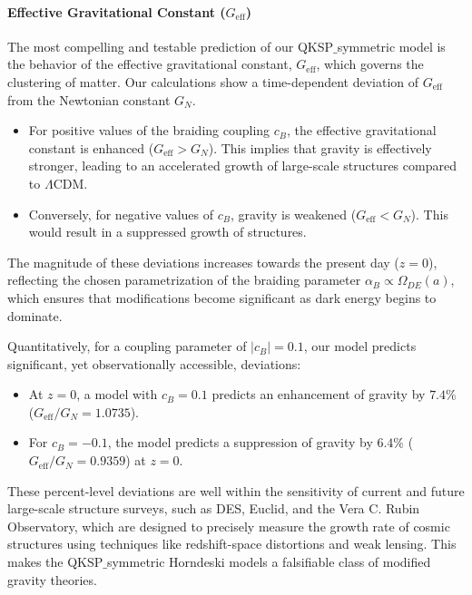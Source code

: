\documentclass[twocolumn]{aastex631}
\begin{document}
\paragraph{Effective Gravitational Constant ($G_{\text{eff}}$)}
The most compelling and testable prediction of our QKSP\ensuremath{\_}symmetric model is the behavior of the effective gravitational constant, $G_{\text{eff}}$, which governs the clustering of matter. Our calculations show a time-dependent deviation of $G_{\text{eff}}$ from the Newtonian constant $G_N$.
\begin{itemize}
    \item For positive values of the braiding coupling $c_B$, the effective gravitational constant is enhanced ($G_{\text{eff}} > G_N$). This implies that gravity is effectively stronger, leading to an accelerated growth of large-scale structures compared to $\Lambda$CDM.
    \item Conversely, for negative values of $c_B$, gravity is weakened ($G_{\text{eff}} < G_N$). This would result in a suppressed growth of structures.
\end{itemize}
The magnitude of these deviations increases towards the present day ($z=0$), reflecting the chosen parametrization of the braiding parameter $\alpha_B \propto \Omega_{DE}(a)$, which ensures that modifications become significant as dark energy begins to dominate.

Quantitatively, for a coupling parameter of $|c_B|=0.1$, our model predicts significant, yet observationally accessible, deviations:
\begin{itemize}
    \item At $z=0$, a model with $c_B = 0.1$ predicts an enhancement of gravity by $7.4\%$ ($G_{\text{eff}}/G_N = 1.0735$).
    \item For $c_B = -0.1$, the model predicts a suppression of gravity by $6.4\%$ ($G_{\text{eff}}/G_N = 0.9359$) at $z=0$.
\end{itemize}
These percent-level deviations are well within the sensitivity of current and future large-scale structure surveys, such as DES, Euclid, and the Vera C. Rubin Observatory, which are designed to precisely measure the growth rate of cosmic structures using techniques like redshift-space distortions and weak lensing. This makes the QKSP\ensuremath{\_}symmetric Horndeski models a falsifiable class of modified gravity theories.
\end{document}
